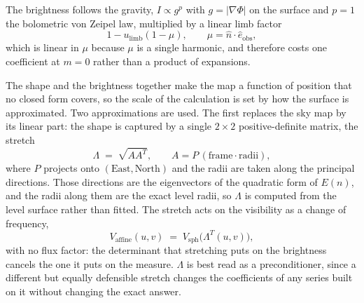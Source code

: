 The brightness follows the gravity, $I \propto g^p$ with $g = |\nabla\Phi|$ on the surface and
$p = 1$ the bolometric von Zeipel law, multiplied by a linear limb factor
\begin{equation}
  1 - u_\text{limb}(1-\mu) , \qquad \mu = \hat n\cdot\hat e_\text{obs} ,
  \label{eq:summary-limb-law}
\end{equation}
which is linear in $\mu$ because $\mu$ is a single harmonic, and therefore costs one
coefficient at $m = 0$ rather than a product of expansions.

The shape and the brightness together make the map a function of position that no closed form
covers, so the scale of the calculation is set by how the surface is approximated.  Two
approximations are used.  The first replaces the sky map by its linear part: the shape is
captured by a single $2\times2$ positive-definite matrix, the stretch
\begin{equation}
  \Lambda \;=\; \sqrt{A A^{T}} , \qquad A = P\,(\text{frame}\cdot\text{radii}) ,
  \label{eq:summary-stretch}
\end{equation}
where $P$ projects onto $(\text{East},\text{North})$ and the radii are taken along the
principal directions.  Those directions are the eigenvectors of the quadratic form of
$E(n)$, and the radii along them are the exact level radii, so $\Lambda$ is computed from the
level surface rather than fitted.  The stretch acts on the visibility as a change of
frequency,
\begin{equation}
  V_\text{affine}(u,v) \;=\; V_\text{sph}\bigl(\Lambda^{T}(u,v)\bigr) ,
  \label{eq:summary-affine}
\end{equation}
with no flux factor: the determinant that stretching puts on the brightness cancels the one
it puts on the measure.  $\Lambda$ is best read as a preconditioner, since a different but
equally defensible stretch changes the coefficients of any series built on it without
changing the exact answer.

